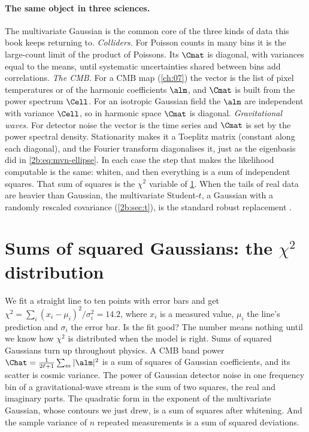 \paragraph{The same object in three sciences.} The multivariate Gaussian is the common core of the three kinds of data this book keeps returning to. \emph{Colliders.} For Poisson counts in many bins it is the large-count limit of the product of Poissons. Its $\Cmat$ is diagonal, with variances equal to the means, until systematic uncertainties shared between bins add correlations. \emph{The CMB.} For a CMB map (\cref{ch:07}) the vector is the list of pixel temperatures or of the harmonic coefficients $\alm$, and $\Cmat$ is built from the power spectrum $\Cell$. For an isotropic Gaussian field the $\alm$ are independent with variance $\Cell$, so in harmonic space $\Cmat$ is diagonal. \emph{Gravitational waves.} For detector noise the vector is the time series and $\Cmat$ is set by the power spectral density. Stationarity makes it a Toeplitz matrix (constant along each diagonal), and the Fourier transform diagonalises it, just as the eigenbasis did in \eqref{2b:eq:mvn-ellipse}. In each case the step that makes the likelihood computable is the same: whiten, and then everything is a sum of independent squares. That sum of squares is the $\chi^2$ variable of \cref{2b:sec:chi2}. When the tails of real data are heavier than Gaussian, the multivariate Student-$t$, a Gaussian with a randomly rescaled covariance (\cref{2b:sec:t}), is the standard robust replacement .
\section{Sums of squared Gaussians: the \texorpdfstring{$\chi^2$}{chi-squared} distribution}
\label{2b:sec:chi2}

We fit a straight line to ten points with error bars and get $\chi^2=\sum_i(x_i-\mu_i)^2/\sigma_i^2=14.2$, where $x_i$ is a measured value, $\mu_i$ the line's prediction and $\sigma_i$ the error bar. Is the fit good? The number means nothing until we know how $\chi^2$ is distributed when the model is right. Sums of squared Gaussians turn up throughout physics. A CMB band power $\Chat=\frac{1}{2\ell+1}\sum_m|\alm|^2$ is a sum of squares of Gaussian coefficients, and its scatter is cosmic variance. The power of Gaussian detector noise in one frequency bin of a gravitational-wave stream is the sum of two squares, the real and imaginary parts. The quadratic form in the exponent of the multivariate Gaussian, whose contours we just drew, is a sum of squares after whitening. And the sample variance of $n$ repeated measurements is a sum of squared deviations.


